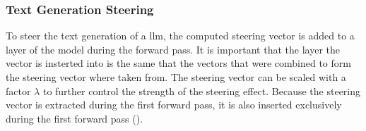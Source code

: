 \subsubsection{Text Generation Steering}
\label{sec:approach:steering:activation}
To steer the text generation of a \acl{llm}, the computed steering vector is added to a layer of the model during the forward pass. It is important that the layer the vector is insterted into is the same that the vectors that were combined to form the steering vector where taken from. The steering vector can be scaled with a factor \(\lambda\) to further control the strength of the steering effect.
Because the steering vector is extracted during the first forward pass, it is also inserted exclusively during the first forward pass (\cite{rimsky-etal-2024-steering}).

